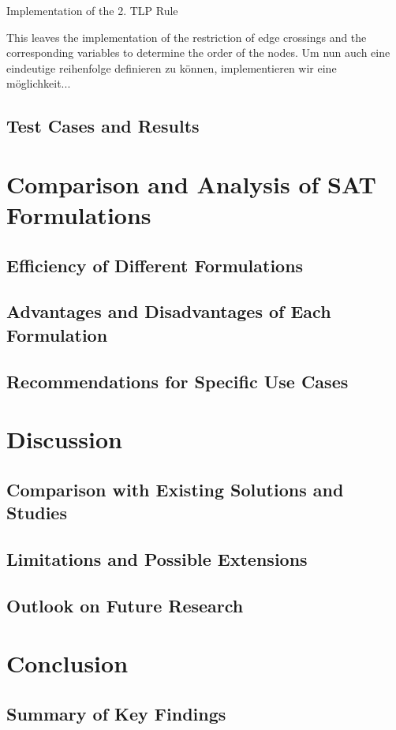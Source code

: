 \documentclass[bachelor, english]{algothesis}
\begin{document}
\begin{algorithm}[ht]
    \caption{Implementation of the 2. TLP Rule}
    \label{alg:second_rule}
\end{algorithm}
\noindent

This leaves the implementation of the restriction of edge crossings and the corresponding variables to determine the order of the nodes.
Um nun auch eine eindeutige reihenfolge definieren zu können, implementieren wir eine möglichkeit...

\section{Test Cases and Results}

\chapter{Comparison and Analysis of SAT Formulations}

\section{Efficiency of Different Formulations}

\section{Advantages and Disadvantages of Each Formulation}

\section{Recommendations for Specific Use Cases}


\chapter{Discussion}

\section{Comparison with Existing Solutions and Studies}

\section{Limitations and Possible Extensions}

\section{Outlook on Future Research}


\chapter{Conclusion}

\section{Summary of Key Findings}

\clearpage


\end{document}
